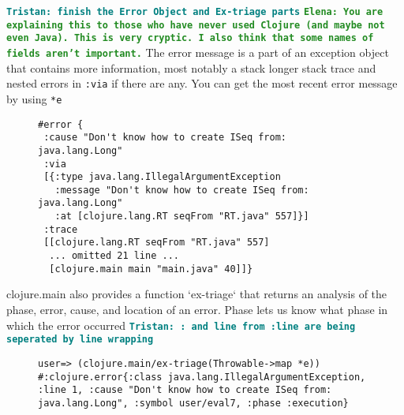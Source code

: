 \documentclass[12pt]{article}
\newcommand{\comment}[1]{{\bf \tt  {#1}}}
\newcommand{\emcomment}[1]{\textcolor{ForestGreen}{\comment{Elena: {#1}}}}
\newcommand{\tkcomment}[1]{\textcolor{Teal}{\comment{Tristan: {#1}}}}
\begin{document}
	\tkcomment{finish the Error Object and Ex-triage parts}
\emcomment{You are explaining this to those who have never used Clojure (and maybe not even Java). This is very cryptic. I also think that some names of fields aren't important.}
	The error message is a part of an exception object that contains more information,
	most notably a stack longer stack trace and nested errors in \texttt{:via} if there are any. You can get the most recent error message by using \texttt{*e}
	\begin{figure}[h]
		\centering
		\begin{lstlisting}[breaklines=true, basicstyle=\ttfamily]
#error {
 :cause "Don't know how to create ISeq from: java.lang.Long"
 :via
 [{:type java.lang.IllegalArgumentException
   :message "Don't know how to create ISeq from: java.lang.Long"
   :at [clojure.lang.RT seqFrom "RT.java" 557]}]
 :trace
 [[clojure.lang.RT seqFrom "RT.java" 557]
  ... omitted 21 line ...
  [clojure.main main "main.java" 40]]}

		\end{lstlisting}
	\end{figure}
	

	clojure.main also provides a function `ex-triage` that returns an analysis of the phase, error, cause, and location of an error.
	Phase lets us know what phase in which the error occurred
	\tkcomment{: and line from :line are being seperated by line wrapping}

	\begin{figure}[h]
		\centering
		\begin{lstlisting}[breaklines=true, basicstyle=\ttfamily]
user=> (clojure.main/ex-triage(Throwable->map *e))
#:clojure.error{:class java.lang.IllegalArgumentException, :line 1, :cause "Don't know how to create ISeq from: java.lang.Long", :symbol user/eval7, :phase :execution}
		\end{lstlisting}
	\end{figure}
\end{document}
